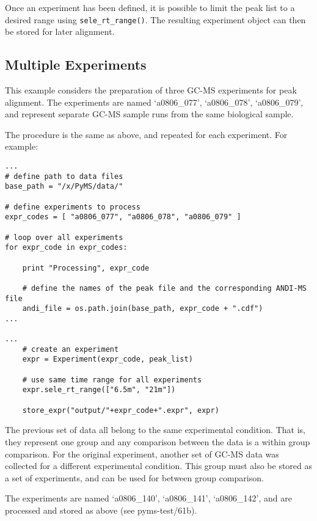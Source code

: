 Once an experiment has been defined, it is possible to limit the peak list to
a desired range using {\tt sele\_rt\_range()}.  The resulting experiment object
can then be stored for later alignment.

\subsection{Multiple Experiments}


This example considers the preparation of three GC-MS experiments for peak
alignment. The experiments are named `a0806\_077', `a0806\_078', `a0806\_079',
and represent separate GC-MS sample runs from the same biological sample.

The procedure is the same as above, and repeated for each experiment.  For
example:

\begin{verbatim}
...
# define path to data files
base_path = "/x/PyMS/data/"

# define experiments to process
expr_codes = [ "a0806_077", "a0806_078", "a0806_079" ]

# loop over all experiments
for expr_code in expr_codes:

    print "Processing", expr_code

    # define the names of the peak file and the corresponding ANDI-MS file
    andi_file = os.path.join(base_path, expr_code + ".cdf")
...

...
    # create an experiment
    expr = Experiment(expr_code, peak_list)

    # use same time range for all experiments
    expr.sele_rt_range(["6.5m", "21m"])

    store_expr("output/"+expr_code+".expr", expr)
\end{verbatim}


The previous set of data all belong to the same experimental condition.  That
is, they represent one group and any comparison between the data is a within
group comparison. For the original experiment, another set of GC-MS data was
collected for a different experimental condition.  This group must also be
stored as a set of experiments, and can be used for between group comparison.

The experiments are named `a0806\_140', `a0806\_141', `a0806\_142', and are
processed and stored as above (see pyms-test/61b).

